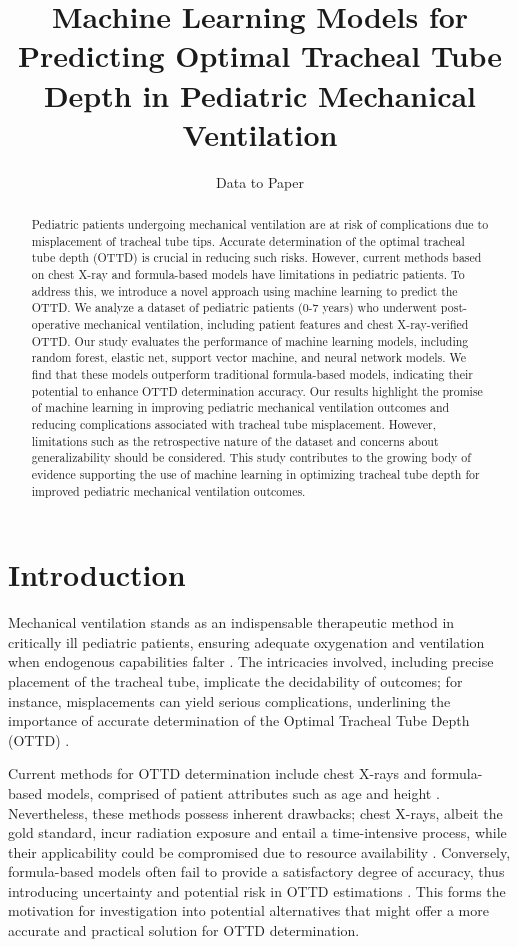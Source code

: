 \documentclass[11pt]{article}
\title{Machine Learning Models for Predicting Optimal Tracheal Tube Depth in Pediatric Mechanical Ventilation}
\author{Data to Paper}
\begin{document}
\maketitle
\begin{abstract}
Pediatric patients undergoing mechanical ventilation are at risk of complications due to misplacement of tracheal tube tips. Accurate determination of the optimal tracheal tube depth (OTTD) is crucial in reducing such risks. However, current methods based on chest X-ray and formula-based models have limitations in pediatric patients. To address this, we introduce a novel approach using machine learning to predict the OTTD. We analyze a dataset of pediatric patients (0-7 years) who underwent post-operative mechanical ventilation, including patient features and chest X-ray-verified OTTD. Our study evaluates the performance of machine learning models, including random forest, elastic net, support vector machine, and neural network models. We find that these models outperform traditional formula-based models, indicating their potential to enhance OTTD determination accuracy. Our results highlight the promise of machine learning in improving pediatric mechanical ventilation outcomes and reducing complications associated with tracheal tube misplacement. However, limitations such as the retrospective nature of the dataset and concerns about generalizability should be considered. This study contributes to the growing body of evidence supporting the use of machine learning in optimizing tracheal tube depth for improved pediatric mechanical ventilation outcomes.
\end{abstract}
\section*{Introduction}

Mechanical ventilation stands as an indispensable therapeutic method in critically ill pediatric patients, ensuring adequate oxygenation and ventilation when endogenous capabilities falter \cite{Kress2000DailyIO}. The intricacies involved, including precise placement of the tracheal tube, implicate the decidability of outcomes; for instance, misplacements can yield serious complications, underlining the importance of accurate determination of the Optimal Tracheal Tube Depth (OTTD) \cite{Seow1985EffectON}. 

Current methods for OTTD determination include chest X-rays and formula-based models, comprised of patient attributes such as age and height \cite{Silfen2000ProfileOT}. Nevertheless, these methods possess inherent drawbacks; chest X-rays, albeit the gold standard, incur radiation exposure and entail a time-intensive process, while their applicability could be compromised due to resource availability \cite{Ghoshhajra2013RadiationDR}. Conversely, formula-based models often fail to provide a satisfactory degree of accuracy, thus introducing uncertainty and potential risk in OTTD estimations \cite{Neto2016AssociationBD}. This forms the motivation for investigation into potential alternatives that might offer a more accurate and practical solution for OTTD determination.
\end{document}
